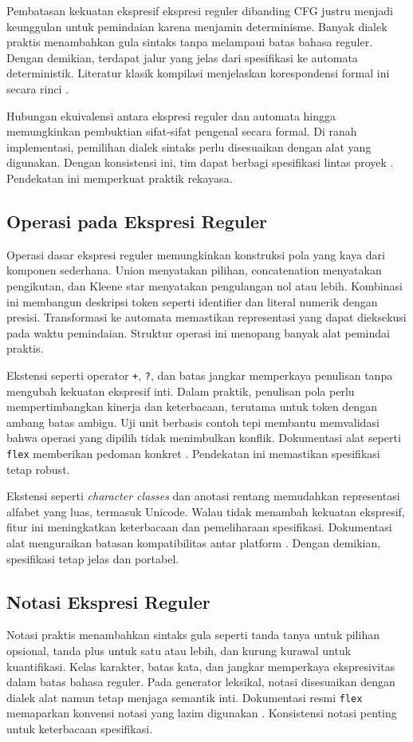 \documentclass[../main.tex]{subfiles}
\begin{document}
Pembatasan kekuatan ekspresif ekspresi reguler dibanding CFG justru menjadi keunggulan untuk pemindaian karena menjamin determinisme. Banyak dialek praktis menambahkan gula sintaks tanpa melampaui batas bahasa reguler. Dengan demikian, terdapat jalur yang jelas dari spesifikasi ke automata deterministik. Literatur klasik kompilasi menjelaskan korespondensi formal ini secara rinci \citep{Mogensen2010}.

Hubungan ekuivalensi antara ekspresi reguler dan automata hingga memungkinkan pembuktian sifat-sifat pengenal secara formal. Di ranah implementasi, pemilihan dialek sintaks perlu disesuaikan dengan alat yang digunakan. Dengan konsistensi ini, tim dapat berbagi spesifikasi lintas proyek \citep{WikiRegex}. Pendekatan ini memperkuat praktik rekayasa.

\subsection{Operasi pada Ekspresi Reguler}
Operasi dasar ekspresi reguler memungkinkan konstruksi pola yang kaya dari komponen sederhana. Union menyatakan pilihan, concatenation menyatakan pengikutan, dan Kleene star menyatakan pengulangan nol atau lebih. Kombinasi ini membangun deskripsi token seperti identifier dan literal numerik dengan presisi. Transformasi ke automata memastikan representasi yang dapat dieksekusi pada waktu pemindaian. Struktur operasi ini menopang banyak alat pemindai praktis.

Ekstensi seperti operator \texttt{+}, \texttt{?}, dan batas jangkar memperkaya penulisan tanpa mengubah kekuatan ekspresif inti. Dalam praktik, penulisan pola perlu mempertimbangkan kinerja dan keterbacaan, terutama untuk token dengan ambang batas ambigu. Uji unit berbasis contoh tepi membantu memvalidasi bahwa operasi yang dipilih tidak menimbulkan konflik. Dokumentasi alat seperti \texttt{flex} memberikan pedoman konkret \citep{FlexManual}. Pendekatan ini memastikan spesifikasi tetap robust.

Ekstensi seperti \emph{character classes} dan anotasi rentang memudahkan representasi alfabet yang luas, termasuk Unicode. Walau tidak menambah kekuatan ekspresif, fitur ini meningkatkan keterbacaan dan pemeliharaan spesifikasi. Dokumentasi alat menguraikan batasan kompatibilitas antar platform \citep{FlexManual}. Dengan demikian, spesifikasi tetap jelas dan portabel.

\subsection{Notasi Ekspresi Reguler}
Notasi praktis menambahkan sintaks gula seperti tanda tanya untuk pilihan opsional, tanda plus untuk satu atau lebih, dan kurung kurawal untuk kuantifikasi. Kelas karakter, batas kata, dan jangkar memperkaya ekspresivitas dalam batas bahasa reguler. Pada generator leksikal, notasi disesuaikan dengan dialek alat namun tetap menjaga semantik inti. Dokumentasi resmi \texttt{flex} memaparkan konvensi notasi yang lazim digunakan \citep{FlexManual}. Konsistensi notasi penting untuk keterbacaan spesifikasi.
\end{document}
